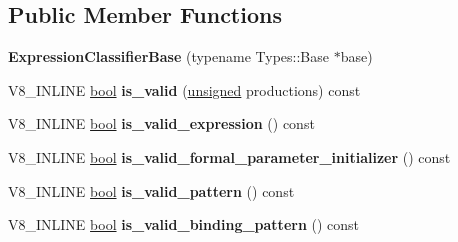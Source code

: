 \subsection*{Public Member Functions}
\begin{DoxyCompactItemize}
\item 
\mbox{\label{classv8_1_1internal_1_1ExpressionClassifierBase_a9d41bf338b0fc999d070bf53997647ab}} 
{\bfseries Expression\+Classifier\+Base} (typename Types\+::\+Base $\ast$base)
\item 
\mbox{\label{classv8_1_1internal_1_1ExpressionClassifierBase_a5ca825b969212998f583a1a549b507cd}} 
V8\+\_\+\+I\+N\+L\+I\+NE \mbox{\hyperlink{classbool}{bool}} {\bfseries is\+\_\+valid} (\mbox{\hyperlink{classunsigned}{unsigned}} productions) const
\item 
\mbox{\label{classv8_1_1internal_1_1ExpressionClassifierBase_a30702d82a07e71ba97b380ceb26b8f27}} 
V8\+\_\+\+I\+N\+L\+I\+NE \mbox{\hyperlink{classbool}{bool}} {\bfseries is\+\_\+valid\+\_\+expression} () const
\item 
\mbox{\label{classv8_1_1internal_1_1ExpressionClassifierBase_a176471557524a1f4cf57d3ffac93021d}} 
V8\+\_\+\+I\+N\+L\+I\+NE \mbox{\hyperlink{classbool}{bool}} {\bfseries is\+\_\+valid\+\_\+formal\+\_\+parameter\+\_\+initializer} () const
\item 
\mbox{\label{classv8_1_1internal_1_1ExpressionClassifierBase_a680ae006a44dc53eb73f79dba085ece2}} 
V8\+\_\+\+I\+N\+L\+I\+NE \mbox{\hyperlink{classbool}{bool}} {\bfseries is\+\_\+valid\+\_\+pattern} () const
\item 
\mbox{\label{classv8_1_1internal_1_1ExpressionClassifierBase_a2a4a7f2e60d30261d4afed933864577e}} 
V8\+\_\+\+I\+N\+L\+I\+NE \mbox{\hyperlink{classbool}{bool}} {\bfseries is\+\_\+valid\+\_\+binding\+\_\+pattern} () const
\item 
\mbox{\label{classv8_1_1internal_1_1ExpressionClassifierBase_ae5231eb6faca873f370b075b26c335ff}} 

\end{DoxyCompactItemize}
